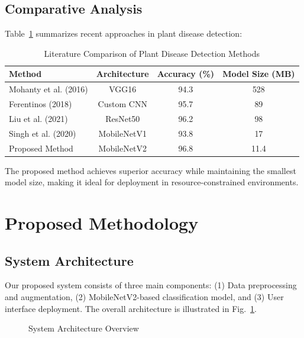 \documentclass[conference,10pt,letterpaper]{IEEEtran}
\begin{document}
\subsection{Comparative Analysis}

Table~\ref{tab:literature_comparison} summarizes recent approaches in plant disease detection:

\begin{table}[htbp]
\centering
\caption{Literature Comparison of Plant Disease Detection Methods}
\label{tab:literature_comparison}
\begin{tabular}{lccc}
\toprule
Method & Architecture & Accuracy (\%) & Model Size (MB) \\
\midrule
Mohanty et al. (2016) & VGG16 & 94.3 & 528 \\
Ferentinos (2018) & Custom CNN & 95.7 & 89 \\
Liu et al. (2021) & ResNet50 & 96.2 & 98 \\
Singh et al. (2020) & MobileNetV1 & 93.8 & 17 \\
Proposed Method & MobileNetV2 & 96.8 & 11.4 \\
\bottomrule
\end{tabular}
\end{table}

The proposed method achieves superior accuracy while maintaining the smallest model size, making it ideal for deployment in resource-constrained environments.

\section{Proposed Methodology}

\subsection{System Architecture}

Our proposed system consists of three main components: (1) Data preprocessing and augmentation, (2) MobileNetV2-based classification model, and (3) User interface deployment. The overall architecture is illustrated in Fig.~\ref{fig:architecture}.

\begin{figure}[htbp]
\centering
{}
\caption{System Architecture Overview}
\label{fig:architecture}
\end{figure}
\end{document}
